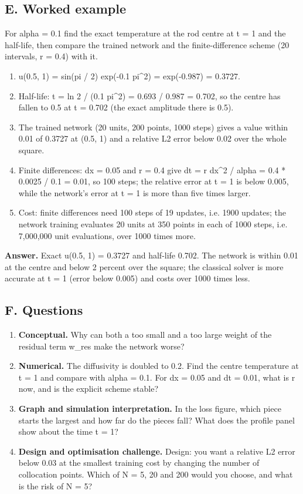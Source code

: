 \documentclass[11pt,a4paper]{article}
\begin{document}
\subsection*{E. Worked example}
For alpha = 0.1 find the exact temperature at the rod centre at t = 1 and the half-life, then compare the trained network and the finite-difference scheme (20 intervals, r = 0.4) with it.
\begin{enumerate}[nosep]
\item u(0.5, 1) = sin(pi / 2) exp(-0.1 pi\textasciicircum{}2) = exp(-0.987) = 0.3727.
\item Half-life: t = ln 2 / (0.1 pi\textasciicircum{}2) = 0.693 / 0.987 = 0.702, so the centre has fallen to 0.5 at t = 0.702 (the exact amplitude there is 0.5).
\item The trained network (20 units, 200 points, 1000 steps) gives a value within 0.01 of 0.3727 at (0.5, 1) and a relative L2 error below 0.02 over the whole square.
\item Finite differences: dx = 0.05 and r = 0.4 give dt = r dx\textasciicircum{}2 / alpha = 0.4 * 0.0025 / 0.1 = 0.01, so 100 steps; the relative error at t = 1 is below 0.005, while the network's error at t = 1 is more than five times larger.
\item Cost: finite differences need 100 steps of 19 updates, i.e. 1900 updates; the network training evaluates 20 units at 350 points in each of 1000 steps, i.e. 7,000,000 unit evaluations, over 1000 times more.
\end{enumerate}
\textbf{Answer.} Exact u(0.5, 1) = 0.3727 and half-life 0.702. The network is within 0.01 at the centre and below 2 percent over the square; the classical solver is more accurate at t = 1 (error below 0.005) and costs over 1000 times less.

\subsection*{F. Questions}
\begin{enumerate}[nosep]
\item \textbf{Conceptual.} Why can both a too small and a too large weight of the residual term w\_res make the network worse?
\item \textbf{Numerical.} The diffusivity is doubled to 0.2. Find the centre temperature at t = 1 and compare with alpha = 0.1. For dx = 0.05 and dt = 0.01, what is r now, and is the explicit scheme stable?
\item \textbf{Graph and simulation interpretation.} In the loss figure, which piece starts the largest and how far do the pieces fall? What does the profile panel show about the time t = 1?
\item \textbf{Design and optimisation challenge.} Design: you want a relative L2 error below 0.03 at the smallest training cost by changing the number of collocation points. Which of N = 5, 20 and 200 would you choose, and what is the risk of N = 5?
\end{enumerate}
\end{document}
